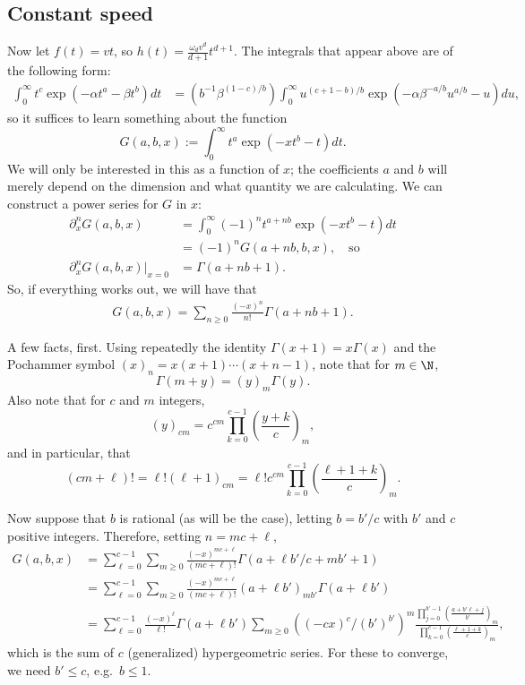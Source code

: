 \documentclass{article}
\begin{document}
\subsection{Constant speed}

Now let $f(t) = vt$, so $h(t) = \frac{ \omega_d v^d }{ d+1 } t^{d+1}$.
The integrals that appear above are of the following form:
\begin{align}
  \int_0^\infty t^c \exp \left( - \alpha t^a - \beta t^b \right) dt 
            &= \left( b^{-1} \beta^{ (1-c)/b } \right) \int_0^\infty u^{(c+1-b)/b} \exp\left( - \alpha \beta^{-a/b} u^{a/b} - u \right) du ,
\end{align}
so it suffices to learn something about the function
\begin{equation}
    G(a,b,x) := \int_0^\infty  t^a \exp\left( -x t^b - t \right) dt .
\end{equation}
We will only be interested in this as a function of $x$; 
the coefficients $a$ and $b$ will merely depend on the dimension and what quantity we are calculating.
We can construct a power series for $G$ in $x$:
\begin{align}
    \partial_x^n G(a,b,x) &= \int_0^\infty (-1)^n t^{a+nb} \exp\left( -x t^b - t \right) dt \\
            &= (-1)^n G(a+nb,b,x) , \quad \mbox{so} \\
    \partial_x^n G(a,b,x) \vert_{x=0} &= \Gamma(a+nb+1) .
\end{align}
So, if everything works out, we will have that
\begin{align}
    G(a,b,x) = \sum_{n \ge 0} \frac{(-x)^n}{n!} \Gamma(a+nb+1) .
\end{align}

A few facts, first.
Using repeatedly the identity $\Gamma(x+1) = x\Gamma(x)$
and the Pochammer symbol $(x)_n = x(x+1)\cdots(x+n-1)$,
note that for $m \in \N$,
\[
    \Gamma(m+y) = (y)_m \Gamma(y).
\]
Also note that for $c$ and $m$ integers,
\[
    (y)_{cm} = c^{cm} \prod_{k=0}^{c-1} (\frac{y+k}{c})_{m} ,
\]
and in particular, that
\[
    (cm+\ell)! = \ell! (\ell+1)_{cm} = \ell! c^{cm} \prod_{k=0}^{c-1} (\frac{\ell+1+k}{c})_m .
\]

Now suppose that $b$ is rational (as will be the case), letting $b = b'/c$ with $b'$ and $c$ positive integers.
Therefore, setting $n = mc+\ell$,
\begin{align}
    G(a,b,x) &= \sum_{\ell=0}^{c-1} \sum_{m \ge 0} \frac{(-x)^{mc+\ell}}{(mc+\ell)!} \Gamma(a+\ell b'/c+mb'+1) \\
            &= \sum_{\ell=0}^{c-1} \sum_{m \ge 0} \frac{(-x)^{mc+\ell}}{(mc+\ell)!} (a+\ell b')_{mb'} \Gamma(a + \ell b') \\
            &= \sum_{\ell=0}^{c-1} \frac{ (-x)^{\ell} }{ \ell! } \Gamma(a + \ell b') \sum_{m \ge 0} ( (-cx)^c / (b')^{b'} )^m 
                    \frac{ \prod_{j=0}^{b'-1} (\frac{ a+b'\ell+j }{ b' } )_m }{ \prod_{k=0}^{c-1} (\frac{\ell+1+k}{c})_m } ,
\end{align}
which is the sum of $c$ (generalized) hypergeometric series.
For these to converge, we need $b' \le c$, e.g.\ $b\le 1$.
\end{document}

